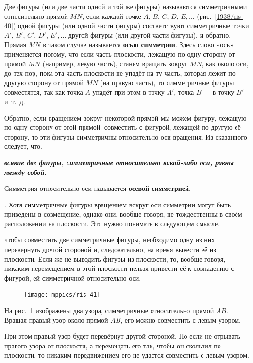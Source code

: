 \documentclass[oneside]{book}
\makeatletter
\newcommand{\rindex}[2][\imki@jobname]{%
  \index[#1]{\detokenize{#2}}%
}
\makeatother
\begin{document}
Две фигуры (или две части одной и той же фигуры) называются симметричными относительно прямой $MN$, если каждой точке $A$, $B$, $C$, $D$, $E,\dots$
(рис.~\ref{1938/ris-40}) одной фигуры (или одной части фигуры) соответствуют симметричные точки $A'$, $B'$, $C'$, $D'$, $E',\dots$ другой фигуры (или другой части фигуры), и обратно.
Прямая $MN$ в таком случае называется \rindex{ось симметрии}\textbf{осью симметрии}. 
Здесь слово «ось» применяется потому, что если часть плоскости, лежащую по одну сторону от прямой $MN$ (например, левую часть), станем вращать вокруг $MN$, как около оси, до тех пор, пока эта часть плоскости не упадёт на ту часть, которая лежит по другую сторону от прямой $MN$ (на правую часть), то симметричные фигуры совместятся, так как точка $A$ упадёт при этом в точку $A'$, точка $B$ — в точку $B'$ и~т.~д.

Обратно, если вращением вокруг некоторой прямой мы можем фигуру, лежащую по одну сторону от этой прямой, совместить с фигурой, лежащей по другую её сторону, то эти фигуры симметричны относительно оси вращения.
Из сказанного следует, что.

\textbf{\emph{всякие две фигуры, симметричные относительно какой-либо оси, равны между собой.}}

Симметрия относительно оси называется \rindex{осевая симметрия}\textbf{осевой симметрией}. 

\smallskip
{}.
Хотя симметричные фигуры вращением вокруг оси симметрии могут быть приведены в совмещение, однако они, вообще говоря, не тождественны в своём расположении на плоскости.
Это нужно понимать в следующем смысле.

чтобы совместить две симметричные фигуры, необходимо одну из них перевернуть другой стороной и, следовательно, на время вывести её из плоскости.
Если же не выводить фигуры из плоскости, то, вообще говоря, никаким перемещением в этой плоскости нельзя привести её к совпадению с фигурой, ей симметричной относительно оси.

\begin{figure}
\centering
\texttt{[image: mppics/ris-41]}
\caption{}\label{1938/ris-41}
\end{figure}

На рис.~\ref{1938/ris-41} изображены два узора, симметричные относительно прямой $AB$.
Вращая правый узор около прямой $AB$, его можно совместить с левым узором.

При этом правый узор будет перевёрнут другой стороной.
Но если не отрывать правого узора от плоскости, а перемещать его так, чтобы он скользил по плоскости, то никаким передвижением его не удастся совместить с левым узором.
\end{document}
